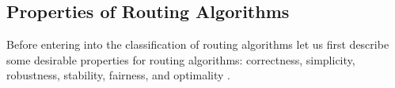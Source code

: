 

%
%
%
%
%     
%

\subsection{Properties of Routing Algorithms}

Before entering into the classification of routing algorithms let us first describe some desirable properties for routing  
algorithms: correctness, simplicity, robustness, stability, fairness, and optimality \cite{Tanenbaum}.

